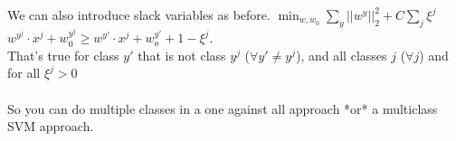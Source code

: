 We can also introduce slack variables as before. 
$\displaystyle \min_{w, w_0} \sum_y ||w^y||_2^2 + C \sum_j \xi^j$ \hfill \\
$w^{y^j} \cdot x^j + w_0^{y^j} \geq w^{y'} \cdot x^j + w_o^{y'} + 1 - \xi^j$. \hfill \\
That's true for class $y'$ that is not class $y^j$ ($\forall y' \neq y^j$), and all classes $j$ ($\forall j$) and for all $\xi^j > 0$ \hfill \\
 \hfill \\
 
 So you can do multiple classes in a one against all approach *or* a multiclass SVM approach.  
 

 
  



